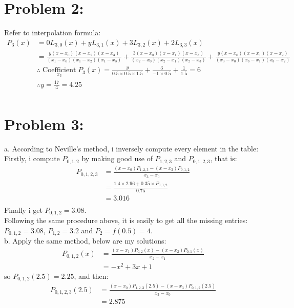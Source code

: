 \documentclass{article}
\begin{document}
\section{Problem 2:}
Refer to interpolation formula: 
\begin{align*}
    P_3(x)&=0L_{3,0}(x)+y L_{3,1}(x)+3L_{3,2}(x)+2L_{3,3}(x) \\
    &=\frac{y(x-x_0)(x-x_2)(x-x_3)}{(x_1-x_0)(x_1-x_2)(x_1-x_3)} + \frac{3(x-x_0)(x-x_1)(x-x_3)}{(x_2-x_0)(x_2-x_1)(x_2-x_3)} + \frac{y(x-x_0)(x-x_1)(x-x_2)}{(x_3-x_0)(x_3-x_1)(x_3-x_2)}
    \\
    &\therefore \operatorname*{Coefficient}\limits_{x_{3}}P_3(x)=\frac{y}{0.5\times0.5\times1.5}+\frac{3}{-1\times0.5}+\frac{1}{1.5}=6 \\
    &\therefore y=\frac{17}{4}=4.25 \\
    \nonumber 
\end{align*}

\section{Problem 3:}
a. According to Neville's method, i inversely compute every element in the table: \\
Firstly, i compute $P_{0,1,2}$ by making good use of $P_{1,2,3}$ and $P_{0,1,2,3}$, that is: \\
\begin{equation}
\begin{aligned}
    P_{0,1,2,3} &= \frac{(x-x_0)P_{1,2,3}-(x-x_3)P_{0,1,2}}{x_3-x_0} \\
    &=\frac{1.4 \times 2.96+0.35 \times P_{0,1,2}}{0.75} \\
    &=3.016 \nonumber \\
\end{aligned}
\end{equation}
Finally i get $P_{0,1,2}=3.08$. \\
Following the same procedure above, it is easily to get all the missing entries: \\
$P_{0,1,2}=3.08$, $P_{1,2}=3.2$ and $P_{2}=f(0.5)=4$. \\

b. Apply the same method, below are my solutions: \\
\begin{equation}
\begin{aligned}
    P_{0,1,2}(x)&=\frac{(x-x_1)P_{0,2}(x)-(x-x_2)P_{0,1}(x)}{x_2-x_1} \\
             &=-x^2 + 3x + 1  \nonumber
\end{aligned}
\end{equation}
so $P_{0,1,2}(2.5)=2.25$, and then: \\
\begin{equation}
\begin{aligned}
    P_{0,1,2,3}(2.5)&=\frac{(x-x_0)P_{1,2,3}(2.5)-(x-x_3)P_{0,1,2}(2.5)}{x_3-x_0} \\
               &=2.875 \nonumber
\end{aligned}
\end{equation}
\end{document}

